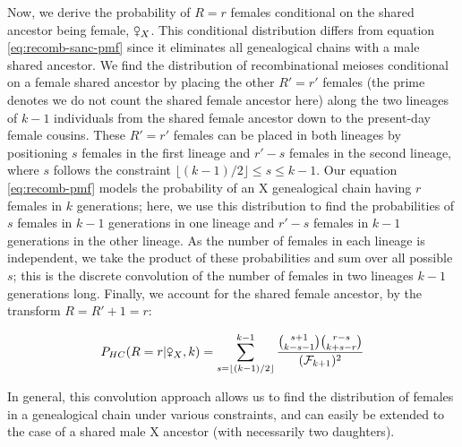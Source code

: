 \documentclass[11pt]{article}
\newcommand{\fsxa}{\venus_X}
\begin{document}
Now, we derive the probability of $R=r$ females conditional on the shared
ancestor being female, $\fsxa$. This conditional distribution differs from
equation \eqref{eq:recomb-sanc-pmf} since it eliminates all genealogical chains
with a male shared ancestor. We find the distribution of recombinational
meioses conditional on a female shared ancestor by placing the other $R'=r'$
females (the prime denotes we do not count the shared female ancestor here)
along the two lineages of $k-1$ individuals from the shared female ancestor
down to the present-day female cousins. These $R'=r'$ females can be placed in
both lineages by positioning $s$ females in the first lineage and $r'-s$
females in the second lineage, where $s$ follows the constraint $\lfloor
(k-1)/2 \rfloor \le s \le k-1$.  Our equation \eqref{eq:recomb-pmf} models the
probability of an X genealogical chain having $r$ females in $k$ generations;
here, we use this distribution to find the probabilities of $s$ females in
$k-1$ generations in one lineage and $r'-s$ females in $k-1$ generations in the
other lineage. As the number of females in each lineage is independent, we take
the product of these probabilities and sum over all possible $s$; this is the
discrete convolution of the number of females in two lineages $k-1$ generations
long.  Finally, we account for the shared female ancestor, by the transform $R
= R' + 1 = r$:

\begin{equation}
  \label{eq:prob-r-given-female}
  P_{HC}(R=r | \fsxa, k) = \sum_{s=\lfloor (k-1)/2 \rfloor}^{k-1} \frac{ {s + 1 \choose k - s - 1 } { r - s \choose k + s - r } }{(\mathcal{F}_{k+1})^2}
\end{equation}

In general, this convolution approach allows us to find the distribution of
females in a genealogical chain under various constraints, and can easily be
extended to the case of a shared male X ancestor (with necessarily two
daughters).
 
\end{document}

